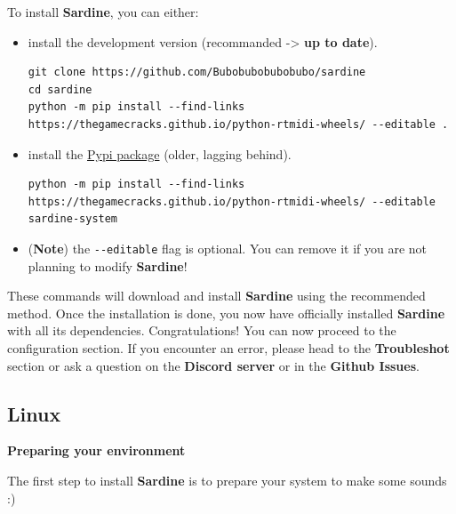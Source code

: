 \documentclass[11pt]{article}
\begin{document}
To install \textbf{Sardine}, you can either:
\begin{itemize}
\item install the development version (recommanded -> \textbf{up to date}).
\begin{verbatim}
git clone https://github.com/Bubobubobubobubo/sardine
cd sardine
python -m pip install --find-links https://thegamecracks.github.io/python-rtmidi-wheels/ --editable .
\end{verbatim}
\item install the \href{https://pypi.org/project/sardine-system/}{Pypi package} (older, lagging behind).
\begin{verbatim}
python -m pip install --find-links https://thegamecracks.github.io/python-rtmidi-wheels/ --editable sardine-system
\end{verbatim}
\item (\textbf{Note}) the \texttt{-{}-editable} flag is optional. You can remove it if you are not planning to modify \textbf{Sardine}!
\end{itemize}

These commands will download and install \textbf{Sardine} using the recommended method. Once the installation is done, you now have officially installed \textbf{Sardine} with all its dependencies. Congratulations! You can now proceed to the configuration section. If you encounter an error, please head to the \textbf{Troubleshot} section or ask a question on the \textbf{Discord server} or in the \textbf{Github Issues}.

\subsection{Linux}
\label{sec:org7819a46}

\textbf{Preparing your environment}

The first step to install \textbf{Sardine} is to prepare your system to make some sounds :)
\end{document}
